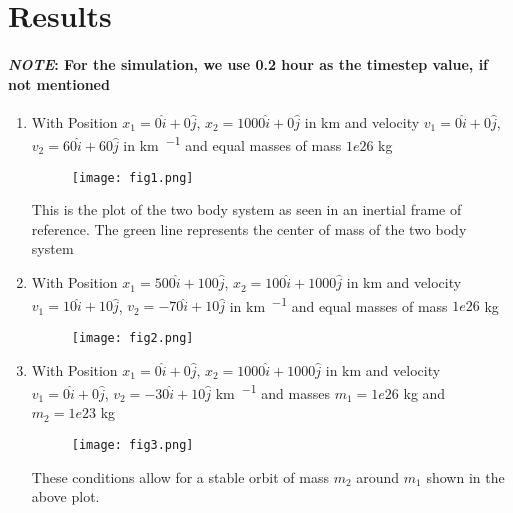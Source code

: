 \section{Results}

\paragraph{\textit{NOTE}: For the simulation, we use 0.2 hour as the timestep value, if not mentioned}

\begin{enumerate}

    \item
        With Position $x_1 = 0\hat{i} + 0\hat{j}$, $x_2 = 1000\hat{i} + 0\hat{j}$ in \si{\km} and velocity $v_1 = 0\hat{i} + 0\hat{j}$, $v_2 = 60\hat{i} + 60\hat{j}$ in \si{\km \per \sec} and equal masses of mass $1e26$ kg

        \begin{figure}[h!]
            \centering
            \texttt{[image: fig1.png]}
        \end{figure}

        This is the plot of the two body system as seen in an inertial frame of reference. The green line represents the center of mass of the two body system

    \item
        With Position $x_1 = 500\hat{i} + 100\hat{j}$, $x_2 = 100\hat{i} + 1000\hat{j}$ in km and velocity $v_1 = 10\hat{i} + 10\hat{j}$, $v_2 = -70\hat{i} + 10\hat{j}$ in \si{\km \per \sec} and equal masses of mass $1e26$ kg

        \begin{figure}[h!]
            \texttt{[image: fig2.png]}
            \centering
        \end{figure}

        \newpage
    \item
        With Position $x_1 = 0\hat{i} + 0\hat{j}$, $x_2 = 1000\hat{i} + 1000\hat{j}$ in \si{\km} and velocity $v_1 = 0\hat{i} + 0\hat{j}$, $v_2 = -30\hat{i} + 10\hat{j}$ \si{\km \per \sec} and masses $m_1 = 1e26$ kg and $m_2 = 1e23$ kg


        \begin{figure}[h!]
            \texttt{[image: fig3.png]}
            \centering
        \end{figure}

        These conditions allow for a stable orbit of mass $m_2$ around $m_1$ shown in the above plot.

\end{enumerate}
